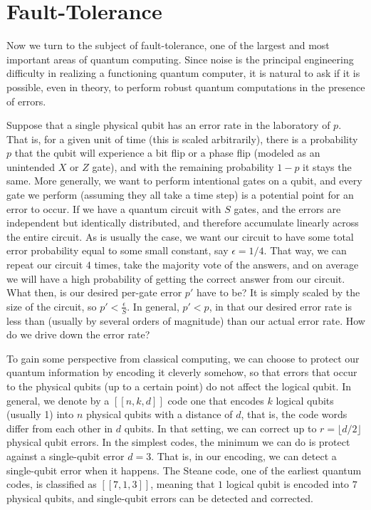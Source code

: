 \section{Fault-Tolerance}

Now we turn to the subject of fault-tolerance, one of the largest and most
important areas of quantum computing. Since noise is the principal engineering
difficulty in realizing a functioning quantum computer, it is natural to
ask if it is possible, even in theory, to perform robust quantum computations
in the presence of errors.

Suppose that a single physical qubit has an error rate in the laboratory of
$p$. That is, for a given unit of time (this is scaled arbitrarily),
there is a probability $p$ that the
qubit will experience a bit flip or a phase flip (modeled as an unintended
$X$ or $Z$ gate), and with the remaining probability $1-p$ it stays the same.
More generally, we want to perform intentional gates on a qubit, and every gate
we perform (assuming they all take a time step) is a potential point for an
error to occur. If we have a quantum circuit with $S$ gates, and the errors
are independent but identically distributed, and therefore accumulate
linearly across the entire circuit. As is usually the case, we want our circuit
to have some total error probability equal to some small constant, say
$\epsilon = 1/4$. That way, we can repeat our circuit $4$ times, take the majority vote
of the answers, and on average we will have a high probability of getting the
correct answer from our circuit. What then, is our desired per-gate error $p'$
have to be? It is simply scaled by the size of the circuit, so
$p' < \frac{\epsilon}{S}$. In general, $p' < p$, in that our desired
error rate is less than (usually by several orders of magnitude) than our
actual error rate. How do we drive down the error rate?

To gain some perspective from classical computing, we can choose to protect
our quantum information by encoding it cleverly somehow, so that
errors that occur to the physical qubits (up to a certain point) do not
affect the logical qubit. In general, we denote by a $[[n,k,d]]$ code one that
encodes $k$ logical qubits (usually 1) into $n$ physical qubits with a distance of
$d$, that is, the code words differ from each other in $d$ qubits. In that
setting, we can correct up to $r = \lfloor d/2 \rfloor$ physical qubit errors.
In the simplest codes, the minimum we can do is
protect against a single-qubit error $d=3$. That is, in our encoding, we can detect
a single-qubit error when it happens. The Steane code, one of the earliest
quantum codes, is classified as $[[7,1,3]]$, meaning that $1$ logical qubit
is encoded into $7$ physical qubits, and single-qubit errors can be detected
and corrected.

